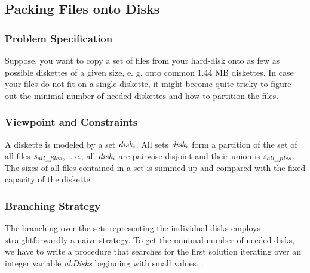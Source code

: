 \documentclass[a4paper]{scrartcl}
\begin{document}
\newpage
\subsection{Packing Files onto Disks}

\subsubsection{Problem Specification}
Suppose, you want to copy a set of files from your hard-disk 
onto as few as possible diskettes of a given size, e. g. onto 
common 1.44 MB diskettes. In case your files do not fit on a 
single diskette, it might become quite tricky to figure out 
the minimal number of needed diskettes and how to partition the files. 

\subsubsection{Viewpoint and Constraints}
A diskette is modeled by a set ${\it disk_i}$. All sets ${\it disk_i}$  
form a partition of the set of all files ${\it s_{all\_files}}$, 
i. e., all ${\it disk_i}$ are pairwise disjoint and their union is 
${\it s_{all\_files}}$. The sizes of all files contained in a set is 
summed up and compared with the fixed capacity of the diskette. 

\subsubsection{Branching Strategy}
The branching over the sets representing the individual disks
employs straightforwardly a naive strategy. To get the minimal
number of needed disks, we have to write a procedure that searches
for the first solution iterating over an integer variable {\it nbDisks}
beginning with small values. .
\end{document}
